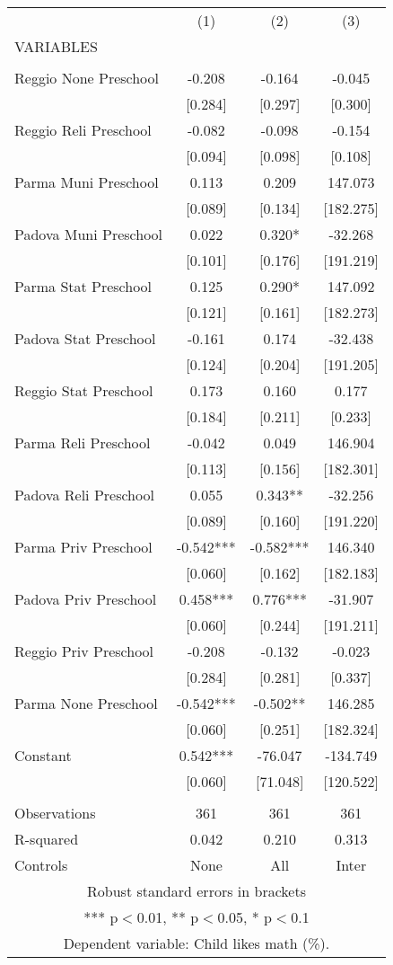 \begin{tabular}{lccc} \hline
 & (1) & (2) & (3) \\
VARIABLES &  &  &  \\ \hline
 &  &  &  \\
Reggio None Preschool & -0.208 & -0.164 & -0.045 \\
 & [0.284] & [0.297] & [0.300] \\
Reggio Reli Preschool & -0.082 & -0.098 & -0.154 \\
 & [0.094] & [0.098] & [0.108] \\
Parma Muni Preschool & 0.113 & 0.209 & 147.073 \\
 & [0.089] & [0.134] & [182.275] \\
Padova Muni Preschool & 0.022 & 0.320* & -32.268 \\
 & [0.101] & [0.176] & [191.219] \\
Parma Stat Preschool & 0.125 & 0.290* & 147.092 \\
 & [0.121] & [0.161] & [182.273] \\
Padova Stat Preschool & -0.161 & 0.174 & -32.438 \\
 & [0.124] & [0.204] & [191.205] \\
Reggio Stat Preschool & 0.173 & 0.160 & 0.177 \\
 & [0.184] & [0.211] & [0.233] \\
Parma Reli Preschool & -0.042 & 0.049 & 146.904 \\
 & [0.113] & [0.156] & [182.301] \\
Padova Reli Preschool & 0.055 & 0.343** & -32.256 \\
 & [0.089] & [0.160] & [191.220] \\
Parma Priv Preschool & -0.542*** & -0.582*** & 146.340 \\
 & [0.060] & [0.162] & [182.183] \\
Padova Priv Preschool & 0.458*** & 0.776*** & -31.907 \\
 & [0.060] & [0.244] & [191.211] \\
Reggio Priv Preschool & -0.208 & -0.132 & -0.023 \\
 & [0.284] & [0.281] & [0.337] \\
Parma None Preschool & -0.542*** & -0.502** & 146.285 \\
 & [0.060] & [0.251] & [182.324] \\
Constant & 0.542*** & -76.047 & -134.749 \\
 & [0.060] & [71.048] & [120.522] \\
 &  &  &  \\
Observations & 361 & 361 & 361 \\
R-squared & 0.042 & 0.210 & 0.313 \\
 Controls & None & All & Inter \\ \hline
\multicolumn{4}{c}{ Robust standard errors in brackets} \\
\multicolumn{4}{c}{ *** p$<$0.01, ** p$<$0.05, * p$<$0.1} \\
\multicolumn{4}{c}{ Dependent variable: Child likes math (\%).} \\
\end{tabular}

